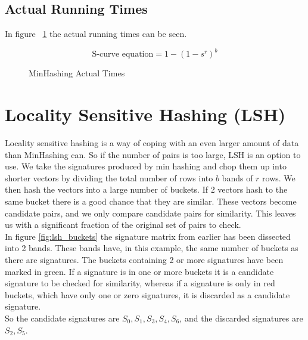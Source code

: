 \documentclass[a4paper,11pt]{article}
\begin{document}
\subsection{Actual Running Times}
In figure ~\ref{fig:minhashing_at} the actual running times can be seen.


\begin{figure}[!htpb]
    \begin{center}
        
        \caption{MinHashing Actual Times}
        \label{fig:minhashing_at}
    \end{center}
\begin{equation}
    \text {S-curve equation} = 1 - (1 - s^r)^b 
\end{equation}
\end{figure}


\section{Locality Sensitive Hashing (LSH)}
Locality sensitive hashing is a way of coping with an even larger amount of data than MinHashing can. So if the number of pairs is too large, LSH is an option to use. We take the signatures produced by min hashing and chop them up into shorter vectors by dividing the total number of rows into $b$ bands of $r$ rows. We then hash the vectors into a large number of buckets. If 2 vectors hash to the same bucket there is a good chance that they are similar. These vectors become candidate pairs, and we only compare candidate pairs for similarity. This leaves us with a significant fraction of the original set of pairs to check. \\

In figure \ref{fig:lsh_buckets} the signature matrix from earlier has been dissected into 2 bands. These bands have, in this example, the same number of buckets as there are signatures. The buckets containing 2 or more signatures have been marked in green. If a signature is in one or more buckets it is a candidate signature to be checked for similarity, whereas if a signature is only in red buckets, which have only one or zero signatures, it is discarded as a candidate signature. \\

So the candidate signatures are $S_0, S_1, S_3, S_4, S_6$, and the discarded signatures are $S_2, S_5$.
\end{document}
